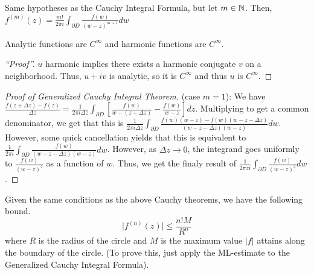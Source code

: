 \documentclass[11pt,leqno,oneside]{amsart}
\begin{document}
  \begin{thm}
    Same hypotheses as the Cauchy Integral Formula, but let $m \in
    {\mathbb N}$. Then, $f^{(m)}(z) = \frac{m!}{2 \pi i} \int_{\partial D} \frac{f(w)}{(w-z)^{m+1}}dw$
  \end{thm}
  \begin{cor}
    Analytic functions are $C^{\infty}$ and harmonic functions are $C^{\infty}$.
  \end{cor}
  \begin{proof}[``Proof'']
    $u$ harmonic implies there exists a harmonic conjugate $v$ on a
    neighborhood. Thus, $u+iv$ is analytic, so it is $C^{\infty}$ and
    thus $u$ is $C^{\infty}$.
  \end{proof}
  \begin{proof}[Proof of Generalized Cauchy Integral Theorem]
    (case $m=1$): We have $\frac{f(z+\Delta z)-f(z)}{\Delta z} =
    \frac{1}{2 \pi i \Delta z} \int_{\partial D} \left[
      \frac{f(w)}{w-(z+\Delta z)} - \frac{f(w)}{w-z} \right]
    dz$. Multiplying to get a common denominator, we get that this is
    $\frac{1}{2 \pi i \Delta z}\int_{\partial
      D}\frac{f(w)(w-z)-f(w)(w-z-\Delta z)}{(w-z-\Delta
      z)(w-z)}dw$. However, some quick cancellation yields that this
    is equivalent to $\frac{1}{2 \pi i} \int_{\partial D}
    \frac{f(w)}{(w-z-\Delta z)(w-z)}dw$. However, as $\Delta z \to 0$,
    the integrand goes uniformly to $\frac{f(w)}{(w-z)^2}$ as a
    function of $w$. Thus, we get the finaly result of $\frac{1}{2 \pi
z    i} \int_{\partial D} \frac{f(w)}{(w-z)^2}dw$.
  \end{proof}
  \begin{thm}
    Given the same conditions as the above Cauchy theorems, we have the following bound.
    $$ \lvert f^{(n)}(z) \rvert \leq \frac{n!M}{R^n}$$
    where $R$ is the radius of the circle and $M$ is the maximum value $|f|$ attains along the boundary of the circle.  (To prove this, just apply the ML-estimate to the Generalized Cauchy Integral Formula).
  \end{thm}
\end{document}
